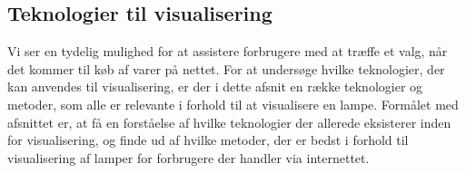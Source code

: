




\subsection{Teknologier til visualisering}
Vi ser en tydelig mulighed for at assistere forbrugere med at træffe et valg, når det kommer til køb af varer på nettet. For at undersøge hvilke teknologier, der kan anvendes til visualisering, er der i dette afsnit en række teknologier og metoder, som alle er relevante i forhold til at visualisere en lampe. Formålet med afsnittet er, at få en forståelse af hvilke teknologier der allerede eksisterer inden for visualisering, og finde ud af hvilke metoder, der er bedst i forhold til visualisering af lamper for forbrugere der handler via internettet.

